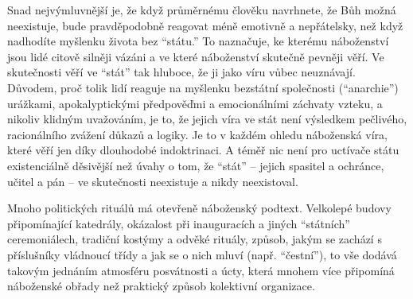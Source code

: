 \documentclass{book}
\begin{document}
Snad nejvýmluvnější je, že když průměrnému člověku navrhnete, že Bůh možná neexistuje, bude pravděpodobně reagovat méně emotivně a nepřátelsky, než když nadhodíte myšlenku života bez \enquote{státu.} To naznačuje, ke kterému náboženství jsou lidé citově silněji vázáni a ve které náboženství skutečně pevněji věří. Ve skutečnosti věří ve \enquote{stát} tak hluboce, že ji jako víru vůbec neuznávají. Důvodem, proč tolik lidí reaguje na myšlenku bezstátní společnosti (\enquote{anarchie}) urážkami, apokalyptickými předpověďmi a emocionálními záchvaty vzteku, a nikoliv klidným uvažováním, je to, že jejich víra ve stát není výsledkem pečlivého, racionálního zvážení důkazů a logiky. Je to v každém ohledu náboženská víra, které věří jen díky dlouhodobé indoktrinaci. A téměř nic není pro uctívače státu existenciálně děsivější než úvahy o tom, že \enquote{stát} -- jejich spasitel a ochránce, učitel a pán -- ve skutečnosti neexistuje a nikdy neexistoval.

Mnoho politických rituálů má otevřeně náboženský podtext. Velkolepé budovy připomínající katedrály, okázalost při inauguracích a jiných \enquote{státních} ceremoniálech, tradiční kostýmy a odvěké rituály, způsob, jakým se zachází s příslušníky vládnoucí třídy a jak se o nich mluví (např. \enquote{čestní}), to vše dodává takovým jednáním atmosféru posvátnosti a úcty, která mnohem více připomíná náboženské obřady než praktický způsob kolektivní organizace.
\end{document}
